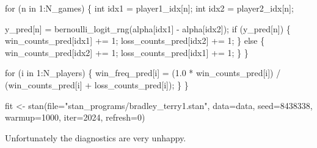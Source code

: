\documentclass[
  letterpaper,
  DIV=11,
  numbers=noendperiod]{scrartcl}
\newenvironment{Shaded}{\begin{snugshade}}{\end{snugshade}}
\newcommand{\AttributeTok}[1]{\textcolor[rgb]{0.40,0.45,0.13}{#1}}
\newcommand{\ControlFlowTok}[1]{\textcolor[rgb]{0.00,0.23,0.31}{#1}}
\newcommand{\DataTypeTok}[1]{\textcolor[rgb]{0.68,0.00,0.00}{#1}}
\newcommand{\DecValTok}[1]{\textcolor[rgb]{0.68,0.00,0.00}{#1}}
\newcommand{\FloatTok}[1]{\textcolor[rgb]{0.68,0.00,0.00}{#1}}
\newcommand{\FunctionTok}[1]{\textcolor[rgb]{0.28,0.35,0.67}{#1}}
\newcommand{\NormalTok}[1]{\textcolor[rgb]{0.00,0.23,0.31}{#1}}
\newcommand{\OtherTok}[1]{\textcolor[rgb]{0.00,0.23,0.31}{#1}}
\newcommand{\SpecialCharTok}[1]{\textcolor[rgb]{0.37,0.37,0.37}{#1}}
\newcommand{\StringTok}[1]{\textcolor[rgb]{0.13,0.47,0.30}{#1}}
\begin{document}
\begin{codelisting}
\begin{Shaded}
\begin{Highlighting}[]
  \ControlFlowTok{for}\NormalTok{ (n }\ControlFlowTok{in} \DecValTok{1}\NormalTok{:N\_games) \{}
    \DataTypeTok{int}\NormalTok{ idx1 = player1\_idx[n];}
    \DataTypeTok{int}\NormalTok{ idx2 = player2\_idx[n];}

\NormalTok{    y\_pred[n] = bernoulli\_logit\_rng(alpha[idx1] {-} alpha[idx2]);}
    \ControlFlowTok{if}\NormalTok{ (y\_pred[n]) \{}
\NormalTok{      win\_counts\_pred[idx1] += }\DecValTok{1}\NormalTok{;}
\NormalTok{      loss\_counts\_pred[idx2] += }\DecValTok{1}\NormalTok{;}
\NormalTok{    \} }\ControlFlowTok{else}\NormalTok{ \{}
\NormalTok{      win\_counts\_pred[idx2] += }\DecValTok{1}\NormalTok{;}
\NormalTok{      loss\_counts\_pred[idx1] += }\DecValTok{1}\NormalTok{;}
\NormalTok{    \}}
\NormalTok{  \}}

  \ControlFlowTok{for}\NormalTok{ (i }\ControlFlowTok{in} \DecValTok{1}\NormalTok{:N\_players) \{}
\NormalTok{    win\_freq\_pred[i] =   (}\FloatTok{1.0}\NormalTok{ * win\_counts\_pred[i])}
\NormalTok{                       / (win\_counts\_pred[i] + loss\_counts\_pred[i]);}
\NormalTok{  \}}
\NormalTok{\}}
\end{Highlighting}
\end{Shaded}

\end{codelisting}

\begin{Shaded}
\begin{Highlighting}[]
\NormalTok{fit }\OtherTok{\textless{}{-}} \FunctionTok{stan}\NormalTok{(}\AttributeTok{file=}\StringTok{"stan\_programs/bradley\_terry1.stan"}\NormalTok{,}
            \AttributeTok{data=}\NormalTok{data, }\AttributeTok{seed=}\DecValTok{8438338}\NormalTok{,}
            \AttributeTok{warmup=}\DecValTok{1000}\NormalTok{, }\AttributeTok{iter=}\DecValTok{2024}\NormalTok{, }\AttributeTok{refresh=}\DecValTok{0}\NormalTok{)}
\end{Highlighting}
\end{Shaded}

Unfortunately the diagnostics are very unhappy.

\begin{Shaded}
\end{Shaded}
\end{document}
